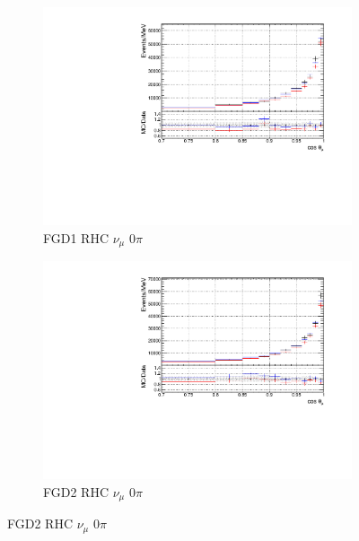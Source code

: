 \begin{figure}[!htbp]
\begin{subfigure}{0.49\textwidth}
  \centering
  \includegraphics[width=\textwidth]{figs/priorpred1D_t_FGD1_NuMuBkg_CC0pi_in_AntiNu_Mode}
  \caption{FGD1 RHC $\nu_{\mu}$ 0$\pi$}
\end{subfigure}
\begin{subfigure}{0.49\textwidth}
  \centering
  \includegraphics[width=\textwidth]{figs/priorpred1D_t_FGD2_NuMuBkg_CC0pi_in_AntiNu_Mode}
  \caption{FGD2 RHC $\nu_{\mu}$ 0$\pi$}
\end{subfigure}


\end{figure}

